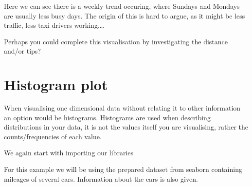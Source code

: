 \documentclass[letterpaper,10pt,english]{jupyterBook}
\begin{document}
\noindent{}

\sphinxAtStartPar
Here we can see there is a weekly trend occuring, where Sundays and Mondays are usually less busy days.
The origin of this is hard to argue, as it might be less traffic, less taxi drivers working,…

\sphinxAtStartPar
Perhaps you could complete this visualisation by investigating the distance and/or tips?


\chapter{Histogram plot}
\label{\detokenize{c4_data_visualisation/histogram:histogram-plot}}\label{\detokenize{c4_data_visualisation/histogram::doc}}
\sphinxAtStartPar
When visualising one dimensional data without relating it to other information an option would be histograms.
Histograms are used when describing distributions in your data, it is not the values itself you are visualising, rather the counts/frequencies of each value.

\sphinxAtStartPar
We again start with importing our libraries

\begin{sphinxVerbatim}[commandchars=\\\{\}]
   
   
\end{sphinxVerbatim}

\sphinxAtStartPar
For this example we will be using the prepared dataset from seaborn containing mileages of several cars.
Information about the cars is also given.

\begin{sphinxVerbatim}[commandchars=\\\{\}]
  
\end{sphinxVerbatim}
\end{document}
